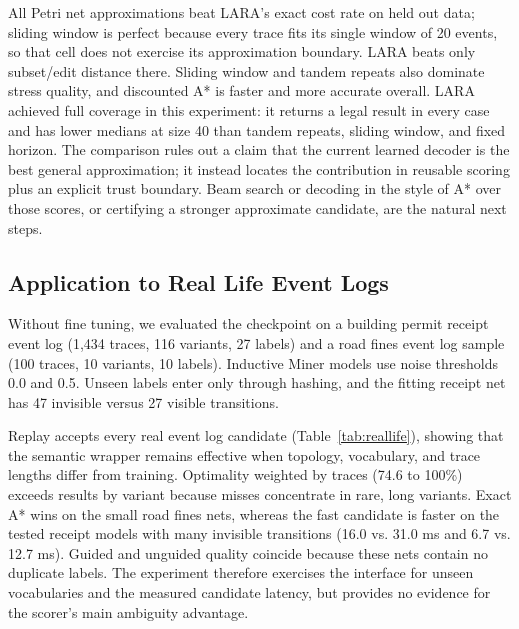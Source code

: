 \documentclass[manuscript,screen,nonacm]{acmart}
\begin{document}
All Petri net approximations beat LARA's exact cost rate on held out data; sliding window is perfect because every trace fits its single window of 20 events, so that cell does not exercise its approximation boundary. LARA beats only subset/edit distance there. Sliding window and tandem repeats also dominate stress quality, and discounted A* is faster and more accurate overall. LARA achieved full coverage in this experiment: it returns a legal result in every case and has lower medians at size 40 than tandem repeats, sliding window, and fixed horizon. The comparison rules out a claim that the current learned decoder is the best general approximation; it instead locates the contribution in reusable scoring plus an explicit trust boundary. Beam search or decoding in the style of A* over those scores, or certifying a stronger approximate candidate, are the natural next steps.
\subsection{Application to Real Life Event Logs}
\label{sec:reallife}

Without fine tuning, we evaluated the checkpoint on a building permit receipt event log \cite{ReceiptLog} (1{,}434 traces, 116 variants, 27 labels) and a road fines event log sample \cite{RoadTrafficLog} (100 traces, 10 variants, 10 labels). Inductive Miner models \cite{Leemans2013} use noise thresholds 0.0 and 0.5. Unseen labels enter only through hashing, and the fitting receipt net has 47 invisible versus 27 visible transitions.

Replay accepts every real event log candidate (Table~\ref{tab:reallife}), showing that the semantic wrapper remains effective when topology, vocabulary, and trace lengths differ from training. Optimality weighted by traces (74.6 to 100\%) exceeds results by variant because misses concentrate in rare, long variants. Exact A* wins on the small road fines nets, whereas the fast candidate is faster on the tested receipt models with many invisible transitions (16.0 vs. 31.0 ms and 6.7 vs. 12.7 ms). Guided and unguided quality coincide because these nets contain no duplicate labels. The experiment therefore exercises the interface for unseen vocabularies and the measured candidate latency, but provides no evidence for the scorer's main ambiguity advantage.
\end{document}
